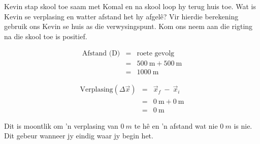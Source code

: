 Kevin stap skool toe saam met Komal en na skool loop hy terug huis toe. Wat is Kevin se verplasing en watter afstand het hy afgel\^e? Vir hierdie berekening gebruik ons Kevin se huis as die verwysingspunt. Kom ons neem aan die rigting na die skool toe is positief.\\
\begin{minipage}{0.5\textwidth}
\begin{eqnarray*}
\text{Afstand (D)} &=& \text{roete~gevolg}\\
&=&500\ \text{m} + 500\ \text{m}\\
&=&1000\ \text{m}
\end{eqnarray*}
\end{minipage}
\begin{minipage}{0.5\textwidth}
\begin{eqnarray*}
\text{Verplasing} (\Delta \vec{x}) &=& \vec{x}_f~ - ~ \vec{x}_i\\
&=&0\ \text{m} + 0\ \text{m}\\
&=&0\ \text{m}
\end{eqnarray*}
\end{minipage} 
\par
Dit is moontlik om 'n verplasing van $0~m$ te h\^e en 'n afstand wat nie $0~m$ is nie. Dit gebeur wanneer jy eindig waar jy begin het.

